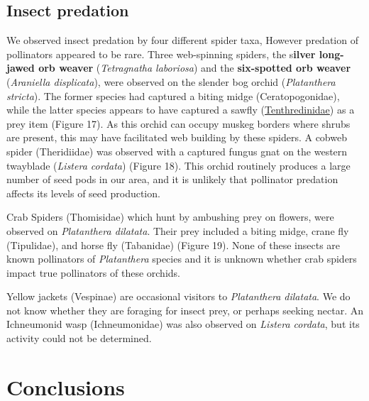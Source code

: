 \begin{multicols}{2}
\subsection{Insect predation}

We observed insect predation by four different spider taxa, However
predation of pollinators appeared to be rare. Three web-spinning
spiders, the s\textbf{ilver long-jawed orb weaver} (\emph{Tetragnatha
laboriosa}) and the \textbf{six-spotted orb weaver} (\emph{Araniella
displicata}), were observed on the slender bog orchid (\emph{Platanthera
stricta}). The former species had captured a biting midge
(Ceratopogonidae), while the latter species appears to have captured a
sawfly
(\href{https://bugguide.net/node/view/13142/bgimage}{Tenthredinidae}) as
a prey item (Figure 17). As this orchid can occupy muskeg borders where
shrubs are present, this may have facilitated web building by these
spiders. A cobweb spider (Theridiidae) was observed with a captured
fungus gnat on the western twayblade (\emph{Listera cordata}) (Figure
18). This orchid routinely produces a large number of seed pods in our
area, and it is unlikely that pollinator predation affects its levels of
seed production.

Crab Spiders (Thomisidae) which hunt by ambushing prey on flowers, were
observed on \emph{Platanthera dilatata}. Their prey included a biting
midge, crane fly (Tipulidae), and horse fly (Tabanidae) (Figure 19).
None of these insects are known pollinators of \emph{Platanthera}
species and it is unknown whether crab spiders impact true pollinators
of these orchids.

Yellow jackets (Vespinae) are occasional visitors to \emph{Platanthera
dilatata}. We do not know whether they are foraging for insect prey, or
perhaps seeking nectar. An Ichneumonid wasp (Ichneumonidae) was also
observed on \emph{Listera cordata}, but its activity could not be
determined.

\section{Conclusions}


\end{multicols}
